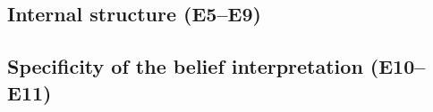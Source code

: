 



\subsection{Internal structure (E5--E9)}






\subsection{Specificity of the belief interpretation (E10--E11)}



